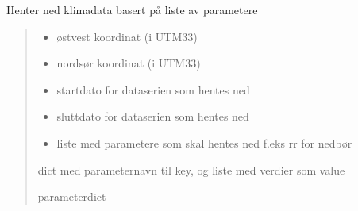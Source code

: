 \documentclass[letterpaper,10pt,norsk]{sphinxmanual}
\begin{document}
\begin{fulllineitems}
\label{\detokenize{index:klimadata.klimadata.hent_data_klima_dogn}}
\pysigstartsignatures
{}
\pysigstopsignatures
\sphinxAtStartPar
Henter ned klimadata basert på liste av parametere
\begin{quote}\begin{description}
\begin{itemize}
\item {} 
\sphinxAtStartPar
{} \textendash{} øst\sphinxhyphen{}vest koordinat (i UTM33)

\item {} 
\sphinxAtStartPar
{} \textendash{} nord\sphinxhyphen{}sør koordinat (i UTM33)

\item {} 
\sphinxAtStartPar
{} \textendash{} startdato for dataserien som hentes ned

\item {} 
\sphinxAtStartPar
{} \textendash{} sluttdato for dataserien som hentes ned

\item {} 
\sphinxAtStartPar
{} \textendash{} liste med parametere som skal hentes ned f.eks rr for nedbør

\end{itemize}

\sphinxAtStartPar
dict med parameternavn til key, og liste med verdier som value

\sphinxAtStartPar
parameterdict

\end{description}\end{quote}

\end{fulllineitems}
\end{document}
